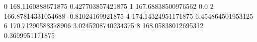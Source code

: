 0 168.1160888671875 0.427703857421875
1 167.68838500976562 0.0
2 166.87814331054688 -0.81024169921875
4 174.14324951171875 6.454864501953125
6 170.71290588378906 3.0245208740234375
8 168.05838012695312 0.3699951171875
